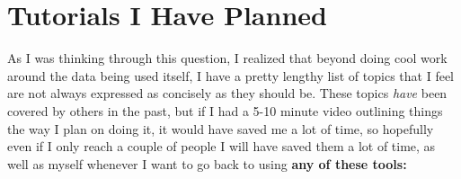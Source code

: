 \documentclass[
]{book}
\begin{document}
\hypertarget{tutorials-planned}{%
\section{Tutorials I Have Planned}\label{tutorials-planned}}

As I was thinking through this question, I realized that beyond doing cool work around the data being used itself, I have a pretty lengthy list of topics that I feel are not always expressed as concisely as they should be. These topics \emph{have} been covered by others in the past, but if I had a 5-10 minute video outlining things the way I plan on doing it, it would have saved me a lot of time, so hopefully even if I only reach a couple of people I will have saved them a lot of time, as well as myself whenever I want to go back to using \textbf{any of these tools:}
\end{document}
